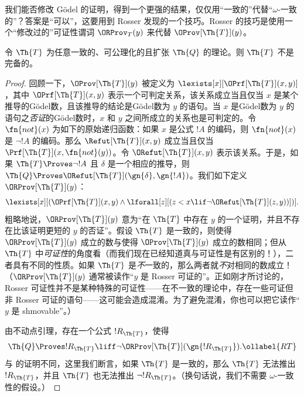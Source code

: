 \documentclass[../../../include/open-logic-section]{subfiles}
\begin{document}


我们能否修改 Gödel 的证明，得到一个更强的结果，仅仅用“一致的”代替“$\omega$-一致的”？答案是“可以”，这要用到 Rosser 发现的一个技巧。Rosser 的技巧是使用一个“修改过的”可证性谓词 $\ORProv_T(y)$ 来代替 $\OProv[\Th{T}](y)$。

\begin{thm}
令 $\Th{T}$ 为任意一致的、可公理化的且扩张 $\Th{Q}$ 的理论。则 $\Th{T}$ 不是完备的。
\end{thm}

\begin{proof}
回顾一下，$\OProv[\Th{T}](y)$ 被定义为 $\lexists[x][\OPrf[\Th{T}](x,
  y)]$，其中 $\OPrf[\Th{T}](x, y)$ 表示一个可判定关系，该关系成立当且仅当 $x$ 是某个推导的Gödel数，且该推导的结论是Gödel数为 $y$ 的语句。当 $x$ 是Gödel数为 $y$ 的语句之\emph{否证}的Gödel数时，$x$ 和 $y$ 之间所成立的关系也是可判定的。令 $\fn{not}(x)$ 为如下的原始递归函数：如果 $x$ 是公式 $!A$ 的编码，则 $\fn{not}(x)$ 是 $\lnot !A$ 的编码。那么 $\Refut[\Th{T}](x, y)$ 成立当且仅当 $\Prf[\Th{T}](x, \fn{not}(y))$。令 $\ORefut[\Th{T}](x, y)$ 表示该关系。于是，如果 $\Th{T} \Proves \lnot !A$ 且 $\delta$ 是一个相应的推导，则 $\Th{Q} \Proves
\ORefut[\Th{T}](\gn{\delta}, \gn{!A})$。我们如下定义 $\ORProv[\Th{T}](y)$：
\[
\lexists[x][(\OPrf[\Th{T}](x,y) \land \lforall[z][(z < x \lif \lnot
  \ORefut[\Th{T}](z,y))])].
\]
粗略地说，$\ORProv[\Th{T}](y)$ 意为“在 $\Th{T}$ 中存在 $y$ 的一个证明，并且不存在比该证明更短的 $y$ 的否证”。假设 $\Th{T}$ 是一致的，则使得 $\ORProv[\Th{T}](y)$ 成立的数与使得 $\OProv[\Th{T}](y)$ 成立的数相同；但从 $\Th{T}$ 中\emph{可证性}的角度看（而我们现在已经知道真与可证性是有区别的！），二者具有不同的性质。如果 $\Th{T}$ 是\emph{不}一致的，那么两者就\emph{不}对相同的数成立！{}（$\ORProv[\Th{T}](y)$ 通常被读作“$y$ 是 Rosser 可证的”。正如刚才所讨论的，Rosser 可证性并不是某种特殊的可证性——在不一致的理论中，存在一些可证但非 Rosser 可证的语句——这可能会造成混淆。为了避免混淆，你也可以把它读作“$y$ 是 shmovable”。）

由不动点引理，存在一个公式 $!R_{\Th{T}}$，使得
\begin{equation}
  \Th{Q} \Proves !R_{\Th{T}} \liff \lnot \ORProv[\Th{T}](\gn{!R_{\Th{T}}}).
  \ollabel{RT}
\end{equation}
与  的证明不同，这里我们断言，如果 $\Th{T}$ 是一致的，那么 $\Th{T}$ 无法推出 $!R_{\Th{T}}$，并且 $\Th{T}$ 也无法推出 $\lnot !R_{\Th{T}}$。（换句话说，我们不需要 $\omega$-一致性的假设。）


\end{proof}
\end{document}
